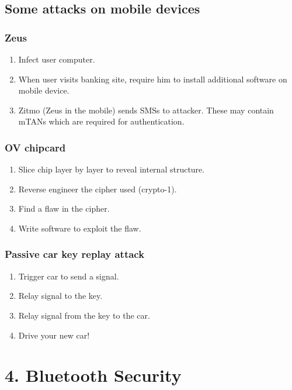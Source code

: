 \documentclass{article}
\begin{document}
\subsection*{Some attacks on mobile devices}

\subsubsection*{Zeus}
\begin{enumerate}
\item Infect user computer.
\item When user visits banking site, require him to install additional software on mobile device.
\item Zitmo (Zeus in the mobile) sends SMSs to attacker. These may contain mTANs which are required for authentication.
\end{enumerate}
    
\subsubsection*{OV chipcard}
\begin{enumerate}
\item Slice chip layer by layer to reveal internal structure.
\item Reverse engineer the cipher used (crypto-1).
\item Find a flaw in the cipher.
\item Write software to exploit the flaw.
\end{enumerate}
    
\subsubsection*{Passive car key replay attack~\cite{francillon2011relay}}
\begin{enumerate}
\item Trigger car to send a signal.
\item Relay signal to the key.
\item Relay signal from the key to the car.
\item Drive your new car!
\end{enumerate}

\newpage
\section*{4. Bluetooth Security}
\end{document}
